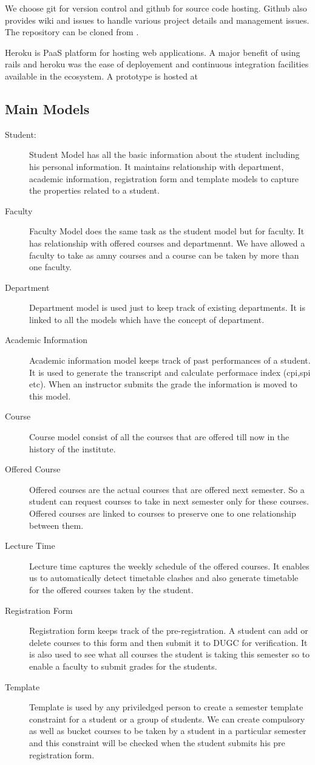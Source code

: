 \documentclass[letterpaper,12pt]{article}
\begin{document}
We choose git for version control and github for source code hosting.
Github also provides wiki and issues to handle various project details
and management issues. The repository can be cloned from \cite{github}.

Heroku is PaaS platform for hosting web applications. A major benefit
of using rails and heroku was the ease of deployement and continuous
integration facilities available in the ecosystem. A prototype is
hosted at \cite{heroku}



\subsection{Main Models}
\begin{description}
\item[Student:]
Student Model has all the basic information about the student including his
personal information. It maintains relationship with department, academic
information, registration form and template models to capture the properties
related to a student.
\item[Faculty]
Faculty Model does the same task as the student model but for faculty. It has
relationship with offered courses and departmennt. We have allowed a faculty
to take as amny courses and a course can be taken by more than one faculty.
\item[Department]
Department model is used just to keep track of existing departments. It is
linked to all the models which have the concept of department.
\item[Academic Information]
Academic information model keeps track of past performances of a student. It
is used to generate the transcript and calculate performace index (cpi,spi
etc). When an instructor submits the grade the information is moved to this
model.
\item[Course]
Course model consist of all the courses that are offered till now in the
history of the institute.
\item[Offered Course]
Offered courses are the actual courses that are offered next semester. So a
student can request courses to take in next semester only for these
courses. Offered courses are linked to courses to preserve one to one
relationship between them.
\item[Lecture Time]
Lecture time captures the weekly schedule of the offered courses. It enables
us to automatically detect timetable clashes and also generate timetable
for the offered courses taken by the student.
\item[Registration Form]
Registration form keeps track of the pre-registration. A student can add or
delete courses to this form and then submit it to DUGC for verification. It is
also used to see what all courses the student is taking this semester so to
enable a faculty to submit grades for the students.
\item[Template]
Template is used by any priviledged person to create a semester template
constraint for a student or a group of students. We can create compulsory as
well as bucket courses to be taken by a student in a particular semester and
this constraint will be checked when the student submits his pre registration
form.
\end{description}
\end{document}
